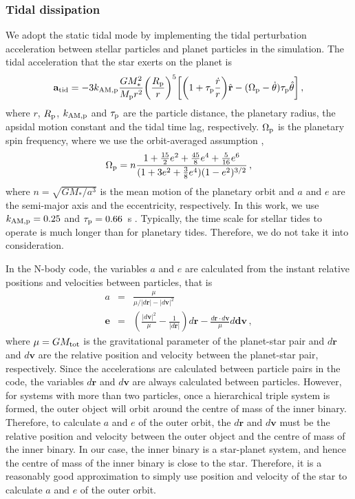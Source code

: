 \documentclass[twocolumn]{aastex63}
\begin{document}
\subsubsection{Tidal dissipation}
We adopt the static tidal mode by implementing the tidal perturbation acceleration between stellar particles and planet particles in the simulation. The tidal acceleration that the star exerts on the planet is
\begin{equation}
\mathbf{a}_{\rm tid} = -3k_{\rm AM,p}\frac{GM_*^2}{M_{\rm p}r^2}\bigg(\frac{R_{\rm p }}{r} \bigg)^5\bigg[ \bigg(1+\tau_{\rm p} \frac{\dot{r}}{r}\bigg)\hat{\mathbf{r}}-(\Omega_{\rm p} - \dot{\theta})\tau_{\rm p}\hat{\mathbf{\theta}} \bigg]\,,
\end{equation}
where $r$, $R_{\rm p}$, $k_{\rm AM,p}$ and $\tau_{\rm p}$ are the particle distance, the planetary radius, the apsidal motion constant and the tidal time lag, respectively. $\Omega_{\rm p}$ is the planetary spin frequency, where we use the orbit-averaged assumption \citep{Hut1981,Hamers2017},
\begin{equation}
\Omega_{\rm p} = n\frac{1+\frac{15}{2}e^2 +\frac{45}{8}e^4+\frac{5}{16}e^6}{(1+3e^2+\frac{3}{8}e^4)(1-e^2)^{3/2}}\,,
\end{equation}
where $n=\sqrt{GM_*/a^3}$ is the mean motion of the planetary orbit and $a$ and $e$ are the semi-major axis and the eccentricity, respectively. In this work, we use $k_{\rm AM,p}=0.25$ and $\tau_{\rm p} = 0.66$~s \citep{Hamers2017}.
Typically, the time scale for stellar tides to operate is much longer than for planetary tides. Therefore, we do not take it into consideration.

{
In the N-body code, the variables $a$ and $e$ are calculated from the instant relative positions and velocities between particles, that is
\begin{eqnarray}
a&=& \frac{\mu}{\mu/|d\mathbf{r}|-|d\mathbf{v}|^2}\\
\mathbf{e}&=& (\frac{|d\mathbf{v}|^2}{\mu}-\frac{1}{|d\mathbf{r}|})d\mathbf{r} - \frac{d\mathbf{r}\cdot d\mathbf{v}}{\mu}d\mathbf{dv}\,,
\end{eqnarray}
where $\mu=GM_{\rm tot}$ is the gravitational parameter of the planet-star pair and $d\mathbf{r}$ and $d\mathbf{v}$ are the relative position and velocity between the planet-star pair, respectively. Since the accelerations are calculated between particle pairs in the code, the variables $d\mathbf{r}$ and $d\mathbf{v}$ are always calculated between particles. However, for systems with more than two particles, once a hierarchical triple system is formed, the outer object will orbit around the centre of mass of the inner binary. Therefore, to calculate $a$ and $e$ of the outer orbit, the $d\mathbf{r}$ and $d\mathbf{v}$ must be the relative position and velocity between the outer object and the centre of mass of the inner binary. In our case, the inner binary is a star-planet system, and hence the centre of mass of the inner binary is close to the star. Therefore, it is a reasonably good approximation to simply use position and velocity of the star to calculate $a$ and $e$ of the outer orbit.
}
\end{document}

